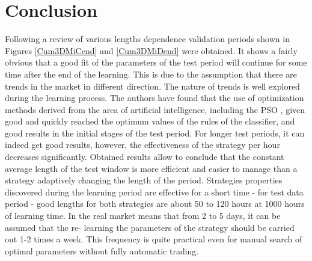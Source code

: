 \documentclass{tewiart}
\begin{document}
\section{Conclusion}

Following a review of various lengths dependence validation periods shown in Figures \ref{Cum3DMiCend} and \ref{Cum3DMiDend} were obtained. It shows a fairly obvious that a good fit of the parameters of the test period will continue for some time after the end of the learning. This is due to the assumption that there are trends in the market in different direction. The nature of trends is well explored during the learning process. The authors have found that the use of optimization methods derived from the area of artificial intelligence, including the PSO \cite{Kennedy}, given good and quickly reached the optimum values of the rules of the classifier, and good results in the initial stages of the test period. For longer test periods, it can indeed get good results, however, the effectiveness of the strategy per hour decreases significantly. Obtained results allow to conclude that the constant average length of the test window is more efficient and easier to manage than a strategy adaptively changing the length of the period. Strategies properties discovered during the learning period are effective for a short time - for test data period - good lengths for both strategies are about 50 to 120 hours at 1000 hours of learning time. In the real market means that from 2 to 5 days, it can be assumed that the re- learning the parameters of the strategy should be carried out 1-2 times a week. This frequency is quite practical even for manual search of optimal parameters without fully automatic trading.\\
\end{document}
